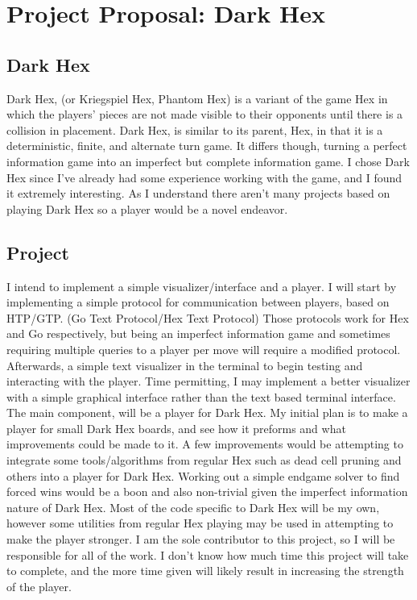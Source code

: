 \documentclass[11pt]{article}
\begin{document}
\section*{Project Proposal: Dark Hex}

\subsection*{Dark Hex}

\noindent Dark Hex, (or Kriegspiel Hex, Phantom Hex) is a variant of the game Hex in which the players’ pieces are not made visible to their opponents until there is a collision in placement.
Dark Hex, is similar to its parent, Hex, in that it is a deterministic, finite, and alternate turn game.
It differs though, turning a perfect information game into an imperfect but complete information game.
I chose Dark Hex since I've already had some experience working with the game, and I found it extremely interesting.
As I understand there aren't many projects based on playing Dark Hex so a player would be a novel endeavor.

\subsection*{Project}

\noindent I intend to implement a simple visualizer/interface and a player.
I will start by implementing a simple protocol for communication between players, based on HTP/GTP. (Go Text Protocol/Hex Text Protocol)
Those protocols work for Hex and Go respectively, but being an imperfect information game and sometimes requiring multiple queries to a player per move will require a modified protocol.
Afterwards, a simple text visualizer in the terminal to begin testing and interacting with the player.
Time permitting, I may implement a better visualizer with a simple graphical interface rather than the text based terminal interface.
The main component, will be a player for Dark Hex.
My initial plan is to make a player for small Dark Hex boards, and see how it preforms and what improvements could be made to it.
A few improvements would be attempting to integrate some tools/algorithms from regular Hex such as dead cell pruning and others into a player for Dark Hex.
Working out a simple endgame solver to find forced wins would be a boon and also non-trivial given the imperfect information nature of Dark Hex.
Most of the code specific to Dark Hex will be my own, however some utilities from regular Hex playing may be used in attempting to make the player stronger.
I am the sole contributor to this project, so I will be responsible for all of the work.
I don't know how much time this project will take to complete, and the more time given will likely result in increasing the strength of the player.
\end{document}
